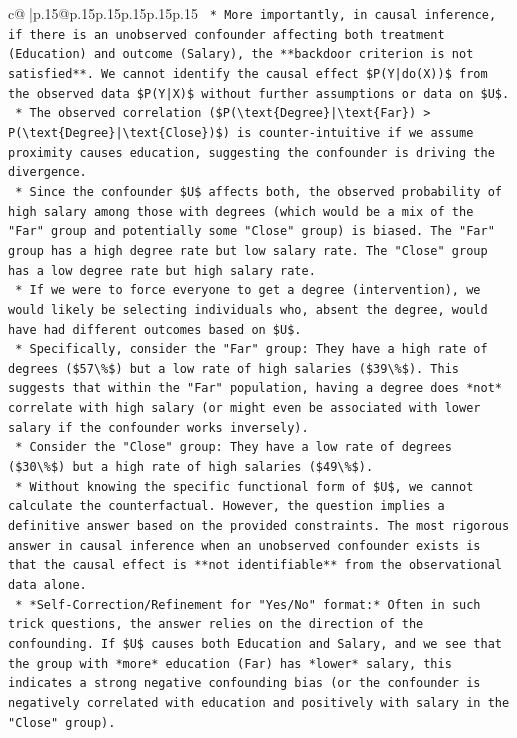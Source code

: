 \documentclass{article}
\begin{document}
{\begin{supertabular}{c@{$\;$}|p{.15\linewidth}@{}p{.15\linewidth}p{.15\linewidth}p{.15\linewidth}p{.15\linewidth}p{.15\linewidth}}
{{{\texttt{    *   More importantly, in causal inference, if there is an unobserved confounder affecting both treatment (Education) and outcome (Salary), the **backdoor criterion is not satisfied**. We cannot identify the causal effect \$P(Y|do(X))\$ from the observed data \$P(Y|X)\$ without further assumptions or data on \$U\$.} \\
\texttt{    *   The observed correlation (\$P(\textbackslash{}text\{Degree\}|\textbackslash{}text\{Far\}) > P(\textbackslash{}text\{Degree\}|\textbackslash{}text\{Close\})\$) is counter{-}intuitive if we assume proximity causes education, suggesting the confounder is driving the divergence.} \\
\texttt{    *   Since the confounder \$U\$ affects both, the observed probability of high salary among those with degrees (which would be a mix of the "Far" group and potentially some "Close" group) is biased. The "Far" group has a high degree rate but low salary rate. The "Close" group has a low degree rate but high salary rate.} \\
\texttt{    *   If we were to force everyone to get a degree (intervention), we would likely be selecting individuals who, absent the degree, would have had different outcomes based on \$U\$.} \\
\texttt{    *   Specifically, consider the "Far" group: They have a high rate of degrees (\$57\textbackslash{}\%\$) but a low rate of high salaries (\$39\textbackslash{}\%\$). This suggests that within the "Far" population, having a degree does *not* correlate with high salary (or might even be associated with lower salary if the confounder works inversely).} \\
\texttt{    *   Consider the "Close" group: They have a low rate of degrees (\$30\textbackslash{}\%\$) but a high rate of high salaries (\$49\textbackslash{}\%\$).} \\
\texttt{    *   Without knowing the specific functional form of \$U\$, we cannot calculate the counterfactual. However, the question implies a definitive answer based on the provided constraints. The most rigorous answer in causal inference when an unobserved confounder exists is that the causal effect is **not identifiable** from the observational data alone.} \\
\texttt{    *   *Self{-}Correction/Refinement for "Yes/No" format:* Often in such trick questions, the answer relies on the direction of the confounding. If \$U\$ causes both Education and Salary, and we see that the group with *more* education (Far) has *lower* salary, this indicates a strong negative confounding bias (or the confounder is negatively correlated with education and positively with salary in the "Close" group).} \\
}}}
\end{supertabular}}
\end{document}
